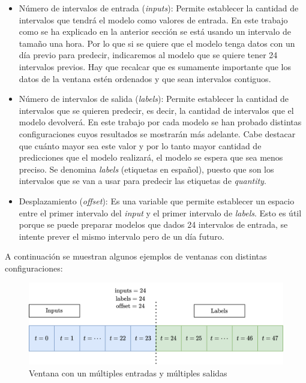 \begin{itemize}
    \item Número de intervalos de entrada (\textit{inputs}): Permite establecer la cantidad de intervalos que tendrá el modelo como valores de entrada. En este trabajo como se ha explicado en la anterior sección se está usando un intervalo de tamaño una hora. Por lo que si se quiere que el modelo tenga datos con un día previo para predecir, indicaremos al modelo que se quiere tener 24 intervalos previos. Hay que recalcar que es sumamente importante que los datos de la ventana estén ordenados y que sean intervalos contiguos.
    
    \item Número de intervalos de salida (\textit{labels}): Permite establecer la cantidad de intervalos que se quieren predecir, es decir, la cantidad de intervalos que el modelo devolverá. En este trabajo por cada modelo se han probado distintas configuraciones cuyos resultados se mostrarán más adelante. Cabe destacar que cuánto mayor sea este valor y por lo tanto mayor cantidad de predicciones que el modelo realizará, el modelo se espera que sea menos preciso. Se denomina \textit{labels} (etiquetas en español), puesto que son los intervalos que se van a usar para predecir las etiquetas de \textit{quantity}.
    
    \item Desplazamiento (\textit{offset}): Es una variable que permite establecer un espacio entre el primer intervalo del \textit{input} y el primer intervalo de \textit{labels}. Esto es útil porque se puede preparar modelos que dados 24 intervalos de entrada, se intente prever el mismo intervalo pero de un día futuro.
\end{itemize}

A continuación se muestran algunos ejemplos de ventanas con distintas configuraciones:

\begin{figure}[H]
    \centering
    \includegraphics[width=12cm]{images/solution/modules/windows/windows-1.png}
    \caption{Ventana con un múltiples entradas y múltiples salidas}
\end{figure}


